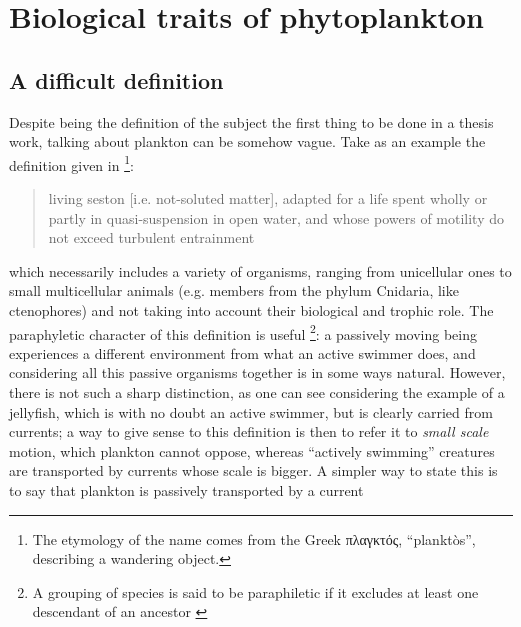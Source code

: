 \section[Biological traits]{Biological traits of phytoplankton}
\subsection{A difficult definition}
Despite being the definition of the subject the first thing to be done in a thesis work, talking about plankton can be somehow vague. Take as an example the definition given in \autocite[chapter 1.1, pag. 2]{reynolds2006ecology}\footnote{The etymology of the name comes from the Greek \textgreek{πλαγκτός}, ``planktòs'', describing a wandering object.}: 
\begin{quotation}
living seston [i.e. not-soluted matter], adapted for a life spent wholly or partly in quasi-suspension in open water, and whose powers of motility do not exceed turbulent entrainment
\end{quotation}
which necessarily includes a variety of organisms, ranging from unicellular ones to small multicellular animals (e.g. members from the phylum Cnidaria, like ctenophores) and not taking into account their biological and trophic role. The paraphyletic character of this definition is useful
\footnote{A grouping of species is said to be paraphiletic if it excludes at least one descendant of an ancestor \autocite[pag. 4]{wiley2015compleat}}:
a passively moving being experiences a different environment from what an active swimmer does, and considering all this passive organisms together is in some ways natural. However, there is not such a sharp distinction, as one can see considering the example of a jellyfish, which is with no doubt an active swimmer, but is clearly carried from currents; a way to give sense to this definition is then to refer it to \textit{small scale} motion, which plankton cannot oppose, whereas ``actively swimming'' creatures are transported by currents whose scale is bigger. A simpler way to state this is to say that plankton is passively transported by a current \autocite{Lalli1997}\\
